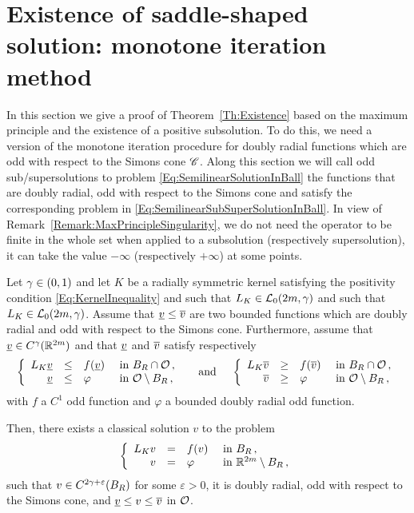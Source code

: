 \section{Existence of saddle-shaped solution: monotone iteration method}
\label{Sec:Existence}


In this section we give a proof of Theorem~\ref{Th:Existence} based on the maximum principle and the existence of a positive subsolution. To do this, we need a version of the monotone iteration procedure for doubly radial functions which are odd with respect to the Simons cone $\mathscr{C}$. Along this section we will call odd sub/supersolutions to problem \eqref{Eq:SemilinearSolutionInBall} the functions that are doubly radial, odd with respect to the Simons cone and satisfy the corresponding problem in \eqref{Eq:SemilinearSubSuperSolutionInBall}. In view of Remark~\ref{Remark:MaxPrincipleSingularity}, we do not need the operator to be finite in the whole set when applied to a subsolution (respectively supersolution), it can take the value $-\infty$ (respectively $+\infty$) at some points.

\begin{proposition}
	\label{Prop:MonotoneIterationOdd}
	Let $\gamma\in (0,1)$ and let $K$ be a radially symmetric kernel  satisfying the positivity condition \eqref{Eq:KernelInequality} and such that $L_K\in \mathcal{L}_0(2m, \gamma)$ and such that $L_K\in \mathcal{L}_0(2m, \gamma)$. Assume that $\underline{v} \leq \overline{v}$ are two bounded functions which are doubly radial and odd with respect to the Simons cone. Furthermore, assume that $\underline{v}\in C^\gamma(\mathbb{R}^{2m})$ and that $\underline{v}$ and $\overline{v}$ satisfy respectively   
	\begin{equation}
	\label{Eq:SemilinearSubSuperSolutionInBall}
	\left\{\begin{array}{rcll}
	L_K\underline{v} & \leq & f(\underline{v}) & \textrm{ in } B_R \cap \mathcal{O}\,, \\
	\underline{v} & \leq & \varphi & \textrm{ in } \mathcal{O} \setminus B_R\,, 
	\end{array} \right.
	\quad \textrm{ and } \quad 
	\left\{\begin{array}{rcll}
	L_K\overline{v} & \geq & f(\overline{v}) & \textrm{ in } B_R \cap \mathcal{O}\,, \\
	\overline{v} & \geq & \varphi & \textrm{ in } \mathcal{O} \setminus B_R\,, 
	\end{array} \right.
	\end{equation}
	with $f$ a $C^1$ odd function and $\varphi$ a bounded doubly radial odd function.
	
	Then, there exists a classical solution $v$ to the problem
	\begin{equation}
	\label{Eq:SemilinearSolutionInBall}
	\left\{\begin{array}{rcll}
	L_K v & = & f(v) & \textrm{ in } B_R\,, \\
	v &=& \varphi &  \textrm{ in } \mathbb{R}^{2m} \setminus B_R\,, 
	\end{array} \right.
	\end{equation}
	such that $v\in C^{2\gamma+\varepsilon}(B_R)$ for some $\varepsilon>0$, it is doubly radial, odd with respect to the Simons cone, and  $\underline{v} \leq v \leq \overline{v}$ in $\mathcal{O}$.
\end{proposition}


